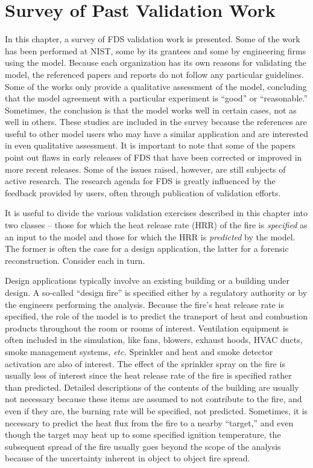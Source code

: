 \chapter{Survey of Past Validation Work}

\label{Survey_Chapter}

In this chapter, a survey of FDS validation work is presented. Some of the work has been  performed at NIST, some by its grantees and some by
engineering firms using the model.  Because each organization has its  own reasons for  validating the model, the  referenced papers and reports do
not follow any particular guidelines. Some of the works only provide  a qualitative assessment  of the model,  concluding that the  model  agreement
with  a  particular  experiment  is ``good''  or ``reasonable.'' Sometimes, the conclusion is that the model works well in certain cases, not as well
in others. These studies are included in the survey because the references  are useful to other model users who may have a similar application  and
are interested in even qualitative assessment. It is important to note  that some of the papers point out flaws in early releases of FDS that have
been corrected or improved in more recent  releases. Some of  the issues raised, however,  are still subjects of  active research. The  research
agenda for FDS  is greatly influenced  by   the  feedback   provided  by  users,   often  through publication of validation efforts.

It is useful to divide the various validation exercises described in this chapter into two classes -- those for which the
heat release rate (HRR) of the fire is {\em specified} as an input to the model and those for which the HRR
is {\em predicted} by the model. The former is often the case for a
design application, the latter for a forensic reconstruction. Consider each in turn.

Design  applications  typically  involve  an existing  building  or  a building  under  design. A  so-called  ``design  fire'' is  specified either
by  a regulatory authority  or by the engineers  performing the analysis. Because the  fire's heat release rate is  specified, the role of the model
is to predict  the transport of heat and combustion products throughout  the room or  rooms of  interest. Ventilation  equipment is often included
in the simulation, like fans,  blowers, exhaust hoods, HVAC ducts,  smoke management systems,  {\em etc.} Sprinkler  and heat and smoke detector
activation are also of interest.  The effect of the sprinkler spray on the fire is usually less of interest since the heat release rate of the fire
is  specified rather  than  predicted. Detailed  descriptions of  the contents of the building are usually not necessary because these items are
assumed to not contribute to the fire,  and even if they are, the burning rate will be specified, not predicted.  Sometimes, it is necessary  to
predict the heat  flux from the fire  to a nearby ``target,''  and even though the target  may heat up  to some specified ignition  temperature, the
subsequent spread  of the  fire usually goes  beyond the scope  of the analysis because of the uncertainty  inherent in object to object fire spread.

